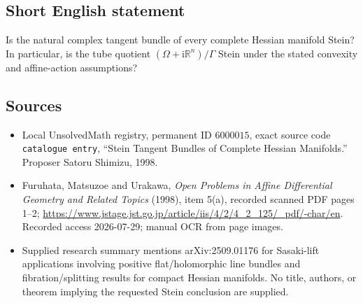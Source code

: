 \documentclass[11pt]{article}
\newcommand{\R}{\mathbb{R}}
\begin{document}
\subsection{Short English statement}
Is the natural complex tangent bundle of every complete Hessian manifold Stein? In particular, is the tube quotient \((\Omega+\mathrm i\R^n)/\Gamma\) Stein under the stated convexity and affine-action assumptions?
\subsection{Sources}
\begin{itemize}
\item Local UnsolvedMath registry, permanent ID \(6000015\), exact source code \texttt{catalogue entry}, ``Stein Tangent Bundles of Complete Hessian Manifolds.'' Proposer Satoru Shimizu, 1998.
\item Furuhata, Matsuzoe and Urakawa, \emph{Open Problems in Affine Differential Geometry and Related Topics} (1998), item 5(a), recorded scanned PDF pages 1--2; \url{https://www.jstage.jst.go.jp/article/iis/4/2/4_2_125/_pdf/-char/en}. Recorded access 2026-07-29; manual OCR from page images.
\item Supplied research summary mentions arXiv:2509.01176 for Sasaki-lift applications involving positive flat/holomorphic line bundles and fibration/splitting results for compact Hessian manifolds. No title, authors, or theorem implying the requested Stein conclusion are supplied.
\end{itemize}
\end{document}
